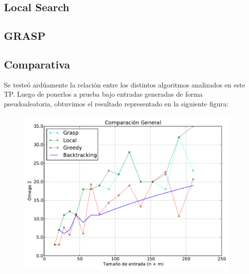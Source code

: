 \documentclass[12pt, a4paper, twoside]{article}
\begin{document}
\begin{TP3}
  \subsection{Local Search}\label{subsec:local}
  
  \newpage

  \subsection{GRASP}\label{subsec:grasp}
  
  \newpage

  \subsection{Comparativa}\label{subsec:comparativa}
  Se testeó ardúamente la relación entre los distintos algoritmos analizados en este TP. Luego de ponerlos a prueba bajo entradas generadas de forma pseudoaleatoria, obtuvimos el resultado representado en la siguiente figura:

  \begin{figure}[H]
    \includegraphics[angle=90]{imagenes/todas_2014-06-27_19-05-53.pdf}
    \label{fig:comparativa}
  \end{figure}


\end{TP3}
\end{document}
